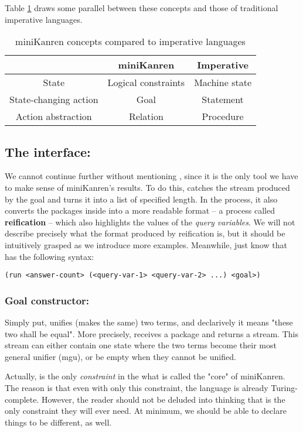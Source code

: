 Table \ref{tab1} draws some parallel between these concepts and those of traditional imperative languages.

\begin{table}
\caption{miniKanren concepts compared to imperative languages}
\label{tab1}
\begin{tabular}{ | c | c | c | }
\hline
 & miniKanren & Imperative \\ 
\hline
State & Logical constraints & Machine state \\  
State-changing action & Goal & Statement \\
Action abstraction & Relation & Procedure \\
\hline
\end{tabular}
\end{table}

\subsection{The interface: }
We cannot continue further without mentioning , since it is the only tool we have to make sense of miniKanren's results. To do this,  catches the stream produced by the goal and turns it into a list of specified length. In the process, it also converts the packages inside into a more readable format -- a process called \textbf{reification} -- which also highlights the values of the \textit{query variables}. We will not describe precisely what the format produced by reification is, but it should be intuitively grasped as we introduce more examples. Meanwhile, just know that  has the following syntax:
\begin{lstlisting}
(run <answer-count> (<query-var-1> <query-var-2> ...) <goal>)
\end{lstlisting}
\subsubsection{Goal constructor: \code{==}}
Simply put, \code{==} unifies (makes the same) two terms, and declarively it means "these two shall be equal". More precisely, \code{==} receives a package and returns a stream. This stream can either contain one state where the two terms become their most general unifier (mgu), or be empty when they cannot be unified.

Actually, \code{==} is the only \textit{constraint} in the what is called the "core" of miniKanren. The reason is that even with only this constraint, the language is already Turing-complete. However, the reader should not be deluded into thinking that \code{==} is the only constraint they will ever need. At minimum, we should be able to declare things to be different, as well.

